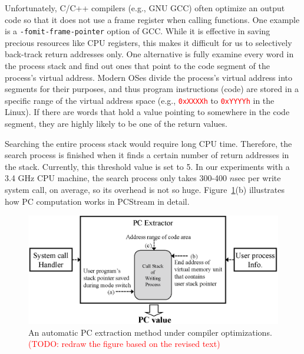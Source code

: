 Unfortunately, C/C++ compilers (e.g., GNU GCC) often optimize an output code so
that it does not use a frame register when calling functions.  One example is a
{\tt -fomit-frame-pointer} option of GCC. While it is effective in saving
precious resources like CPU registers, this makes it difficult for us to
selectively back-track return addresses only. One alternative is fully examine
every word in the process stack and find out ones that point to the code
segment of the process's virtual address.  Modern OSes divide the process's
virtual address into segments for their purposes, and thus program instructions
(code) are stored in a specific range of the virtual address space (e.g.,
\textcolor{red}{\texttt{0xXXXXh}} to \textcolor{red}{\texttt{0xYYYYh}} in the
Linux).  If there are words that hold a value pointing to somewhere in the code
segment, they are highly likely to be one of the return values.  

Searching the entire process stack would require long CPU time. Therefore, the
search process is finished when it finds a certain number of return addresses
in the stack. Currently, this threshold value is set to 5.  In our experiments
with a 3.4 GHz CPU machine, the search process only takes 300-400 $n$sec per
write system call, on average, so its overhead is not so huge.
Figure~\ref{fig:getpc}(b) illustrates how PC computation works in PCStream in
detail.

\begin{figure}[t]
	\centering
	\includegraphics[width=1\linewidth]{figure/getpc}
	\vspace{-10pt}
	\caption{An automatic PC extraction method under compiler optimizations.
	\textcolor{red}{(TODO: redraw the figure based on the revised text)}
	}
	\label{fig:getpc}
	\vspace{-15pt}
\end{figure}


